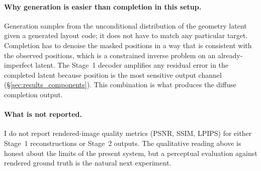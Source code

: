 \paragraph{Why generation is easier than completion in this setup.} Generation samples from the unconditional distribution of the geometry latent given a generated layout code; it does not have to match any particular target. Completion has to denoise the masked positions in a way that is consistent with the observed positions, which is a constrained inverse problem on an already-imperfect latent. The Stage~1 decoder amplifies any residual error in the completed latent because position is the most sensitive output channel (\S\ref{sec:results_components}). This combination is what produces the diffuse completion output.

\paragraph{What is not reported.} I do not report rendered-image quality metrics (PSNR, SSIM, LPIPS) for either Stage~1 reconstructions or Stage~2 outputs. The qualitative reading above is honest about the limits of the present system, but a perceptual evaluation against rendered ground truth is the natural next experiment.